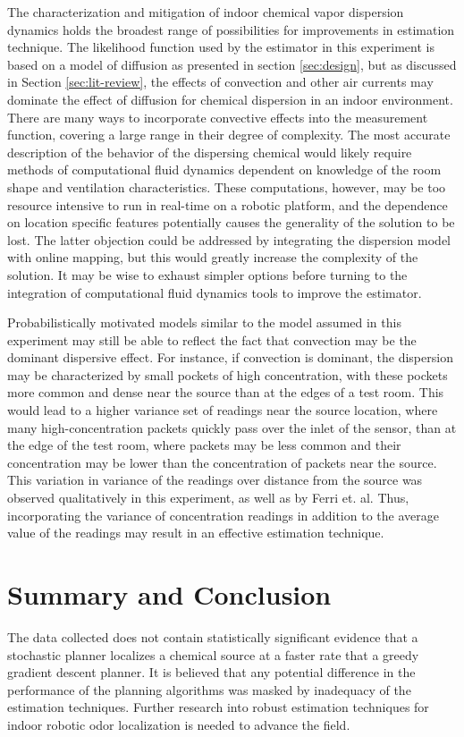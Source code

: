 \documentclass[submit, 12pt]{aiaa-pretty-modified}
\begin{document}
The characterization and mitigation of indoor chemical vapor dispersion dynamics holds the
broadest range of possibilities for improvements in estimation
technique.  The likelihood function used by the estimator in this
experiment is based on a model of diffusion as presented in section \ref{sec:design}, but as discussed in Section
\ref{sec:lit-review}, the effects of convection and other air currents
may dominate the effect of diffusion for
chemical dispersion in an indoor environment. There are many ways to incorporate
convective effects into the measurement function, covering a large range in
their degree of complexity. The most accurate description of the
behavior of the dispersing chemical would likely
require methods of computational fluid dynamics dependent on knowledge of the room
shape and ventilation characteristics. These computations, however, may be
too resource intensive to run in real-time on a robotic platform, and the
dependence on location specific features potentially causes the  generality of the
solution to be lost. The latter objection could be addressed by integrating the dispersion
model with online mapping, but this would greatly increase the complexity of the
solution. It may be wise to exhaust simpler options before turning to
the integration of computational fluid dynamics tools to improve the estimator.

Probabilistically motivated models similar to the model assumed in this experiment may still
be able to reflect the fact that convection may be the dominant dispersive effect. For instance, if
convection is dominant, the dispersion may be characterized by small
pockets of high concentration, with these pockets more common and dense near the
source than at the edges of a test room.  This would lead to a higher
variance set of readings near the source location, where many high-concentration packets quickly pass over the inlet of
the sensor, than at the edge of the test room, where packets may be less
common and their concentration may be lower than the concentration of
packets near the source. This variation in variance of the readings over distance from the source
was observed qualitatively in this
experiment, as well as by Ferri
et. al. \cite{ferri} Thus, incorporating the variance of concentration
readings in addition to the average value of the readings may result
in an effective estimation technique. 


\section{Summary and Conclusion}
The data collected does not contain statistically significant evidence that a
stochastic planner localizes a chemical source at a faster rate that a greedy
gradient descent planner. It is believed that any potential difference
in the performance of the planning
algorithms was masked by inadequacy of the estimation techniques.
Further research into robust estimation techniques for indoor robotic odor
localization is needed to advance the field.
\end{document}
